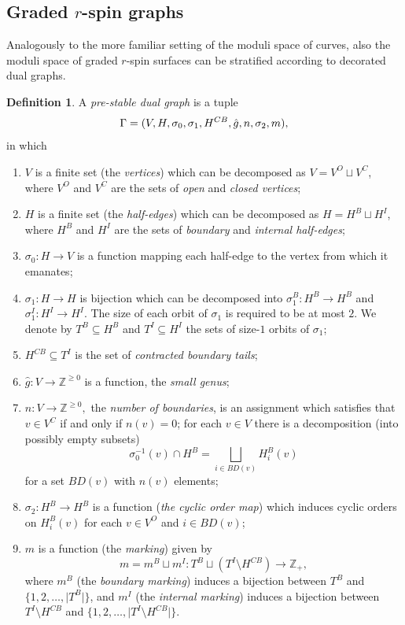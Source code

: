 \documentclass[11pt,a4paper]{article}
\theoremstyle{definition}
\newtheorem{definition}[dummy]{Definition}
\theoremstyle{remark}
\numberwithin{equation}{section}
\begin{document}
\subsection{Graded $r$-spin graphs}\label{subsec rspin graphs}
Analogously to the more familiar setting of the moduli space of curves, also the moduli space of graded $r$-spin surfaces can be stratified according to decorated dual graphs. 
\begin{definition}\label{def graph without spin}
A \textit{pre-stable dual graph} is a tuple
\[\Gamma = (V, H, \sigma_0, \sigma_1, H^{CB},\Hat{g}, n, \sigma_2,  m),\]
in which
\begin{enumerate}[label=(\emph{\roman*})]
\item $V$ is a finite set (the \textit{vertices}) which can be decomposed as $V = V^O \sqcup V^C$, where $V^O$ and $V^C$ are the sets of \textit{open} and \textit{closed vertices};
\item $H$ is a finite set (the \textit{half-edges}) which can be decomposed as $H = H^B \sqcup H^I$, where $H^B$ and $H^I$ are the sets of \textit{boundary} and \textit{internal half-edges};
\item $\sigma_0: H \to V$ is a function mapping each half-edge to the vertex from which it emanates;
\item $\sigma_1: H \to H$ is bijection which can be decomposed into $\sigma_1^B: H^B \to H^B$ and $\sigma_1^I: H^I \to H^I$. The size of each orbit of $\sigma_1$ is required to be at most $2$. We denote by $T^B \subseteq H^B$ and $T^I \subseteq H^I$ the sets of size-$1$ orbits of $\sigma_1$;


\item $H^{CB} \subseteq T^I$ is the set of \textit{contracted boundary tails};
\item $\hat{g}\colon V\to \mathbb Z^{\ge0}$ is a function, the \emph{small genus};
\item $n\colon V\to \mathbb Z^{\ge 0},$ the \emph{number of boundaries}, is an assignment which satisfies that 
$v\in V^C$ if and only if $n(v)=0$; for each $v\in V$ there is a decomposition (into possibly empty subsets)
$$
\sigma_0^{-1}(v)\cap H^B=\bigsqcup_{i\in BD(v)}H^B_i(v)
$$
for a set $BD(v)$ with $n(v)$ elements;
\item $\sigma_2\colon H^B\to H^B$ is a function (\textit{the cyclic order map}) which induces cyclic orders on $H_i^B(v)$ for each $v\in V^O$ and $i\in BD(v)$; 

\item $m$ is a function (the \textit{marking}) given by
\[m = m^B \sqcup m^I: T^B \sqcup (T^I \setminus H^{CB}) \to \mathbb Z_+,\]
where $m^B$  (the \emph{boundary marking}) induces a bijection between $T^B$ and $\{1,2,\dots,\lvert T^B\rvert\}$, and $m^I$ (the \emph{internal marking}) induces a bijection between $T^I \setminus H^{CB}$ and $\{1,2,\dots,\lvert T^I \setminus H^{CB}\rvert\}$.
\end{enumerate}



\end{definition}
\end{document}
